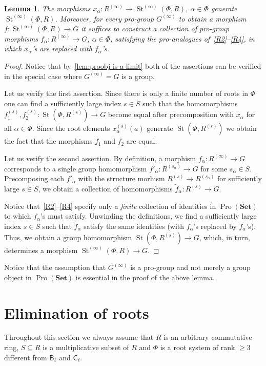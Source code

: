\documentclass[oneside, 11pt]{amsart}
\numberwithin{equation}{section}
\newtheorem{lemma}{Lemma} \numberwithin{lemma}{section}
\theoremstyle{definition}
\theoremstyle{remark}
\DeclareMathOperator\St{St}
\DeclareMathOperator{\Pro}{Pro}
\newcommand{\Set}{\mathbf{Set}}
\newcommand{\rB}{\mathsf{B}}
\newcommand{\rC}{\mathsf{C}}
\begin{document}
\begin{lemma}\label{SteinbergPresentation}
The morphisms $x_{\alpha} \colon R^{(\infty)} \to \St^{(\infty)}(\Phi, R), \ \alpha\in \Phi$ generate $\St^{(\infty)}(\Phi, R)$. Moreover, for every pro-group $G^{(\infty)}$ to obtain a morphism $f \colon \St^{(\infty)}(\Phi, R) \to G$ it suffices to construct a collection of pro-group morphisms \(f_{\alpha} \colon R^{(\infty)} \to G\), $\alpha\in\Phi$, satisfying the pro-analogues of~\eqref{R2}--\eqref{R4}, in which $x_\alpha$'s are replaced with $f_{\alpha}$'s.
\end{lemma}
\begin{proof}
Notice that by~\cref{lem:proobj-is-a-limit} both of the assertions can be verified in the special case where $G^{(\infty)} = G$ is a group.

Let us verify the first assertion. Since there is only a finite number of roots in $\Phi$ one can find a sufficiently large index $s \in S$ such that the homomorphisms $f_1^{(s)}, f_2^{(s)}\colon \St(\Phi, R^{(s)}) \to G$ become equal after precomposition with $x_\alpha$ for all $\alpha \in \Phi$.
Since the root elements $x_\alpha^{(s)}(a)$ generate $\St(\Phi, R^{(s)})$ we obtain the fact that the morphisms $f_1$ and $f_2$ are equal.

Let us verify the second assertion. By definition, a morphism $f_\alpha \colon R^{(\infty)} \to G$ corresponds to a single group homomorphism 
 $f'_\alpha \colon R^{(s_\alpha)} \to G$ for some $s_\alpha \in S$. Precomposing each $f'_\alpha$ with the structure morhism $R^{(s)} \to R^{(s_\alpha)}$ for sufficiently large $s \in S$, we obtain a collection of homomorphisms $\widetilde{f}_\alpha \colon R^{(s)} \to G$.
 
Notice that~\eqref{R2}--\eqref{R4} specify only a {\it finite} collection of identities in $\Pro(\Set)$ to which $f_\alpha$'s must satisfy.
Unwinding the definitions, we find a sufficiently large index $s \in S$ such that $\widetilde{f}_\alpha$ satisfy the same identities (with $f_\alpha$'s replaced by $\widetilde{f}_\alpha$'s).
Thus, we obtain a group homomorphism $\St(\Phi, R^{(s)}) \to G$, which, in turn, determines a morphism $\St^{(\infty)}(\Phi, R) \to G$.
\end{proof}
Notice that the assumption that $G^{(\infty)}$ is a pro-group and not merely a group object in $\Pro(\Set)$ is essential in the proof of the above lemma.

\section{Elimination of roots}
Throughout this section we always assume that \(R\) is an arbitrary commutative ring,
 \(S \subseteq R\) is a multiplicative subset of $R$ and \(\Phi\) is a root system of rank \(\geq 3\) different from \(\rB_\ell\) and \(\rC_\ell\). 
\end{document}

